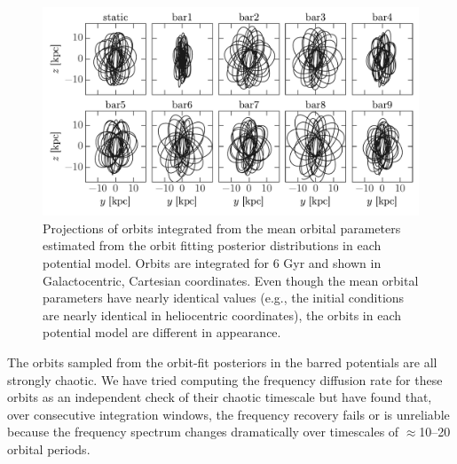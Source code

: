 \documentclass[letterpaper,12pt,preprint]{aastex}
\begin{document}
\begin{figure}[!tbp]
\begin{center}
\includegraphics[width=\textwidth]{figures/orbit-yz}
\caption{  Projections of orbits integrated from the mean orbital parameters  estimated from the orbit fitting posterior distributions in each potential model. Orbits are integrated for 6 Gyr and shown in Galactocentric, Cartesian coordinates. Even though the mean orbital parameters have nearly identical values (e.g., the initial conditions are nearly identical in heliocentric coordinates), the orbits in each potential model are  different in appearance. }
\label{fig:orbits-yz}
\end{center}
\end{figure}

The orbits sampled from the orbit-fit posteriors in the barred potentials are all strongly chaotic. We have tried computing the frequency diffusion rate for these orbits as an independent check of their chaotic timescale but have found that, over consecutive integration windows, the frequency recovery fails or is unreliable because the frequency spectrum changes dramatically over timescales of $\approx$10--20 orbital periods. 
\end{document}
